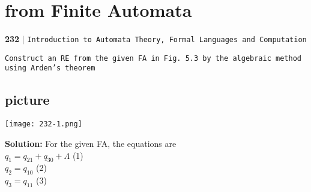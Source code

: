 \documentclass[9pt]{beamer}
\begin{document}
\begin{frame}
\section*{from Finite Automata}
\begin{flushleft}
    \textbf{232}\hspace*{0.1cm} \textbf{$|$} \hspace*{0.1cm} \texttt{Introduction to Automata Theory, Formal Languages and Computation}
  \end{flushleft}

\vspace*{0.3cm}
\hspace*{0.1cm} \texttt{\small{Construct an RE from the given FA in Fig. 5.3 by the algebraic method using Arden’s theorem}}\\

\begin{center}
\section{picture}
\texttt{[image: 232-1.png]}
\end{center}

\small{
\textbf{Solution:} For the given FA, the equations are\\

\vspace*{0.1cm}
\hspace*{4cm} $q_1 = q_21 + q_30 + \Lambda$  \hspace*{3.4cm}  (1) \\
\hspace*{4cm} $q_2 = q_10$  \hspace*{4.7cm}  (2) \\
\hspace*{4cm} $q_3 = q_11$  \hspace*{4.7cm}  (3) \\
}
\end{frame}
\end{document}
